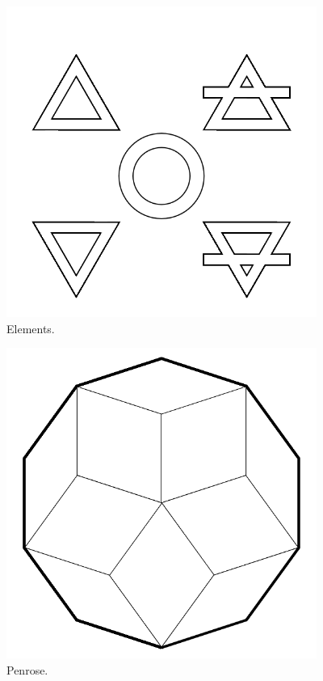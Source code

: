 \begin{figure}
	\centering
	\includegraphics[width=4in]{imageserver/uploadimages/image6.png}
	\caption{Elements.}
\end{figure}

\begin{figure}
	\centering
	\includegraphics[width=4in]{imageserver/uploadimages/image7.png}
	\caption{Penrose.}
\end{figure}

